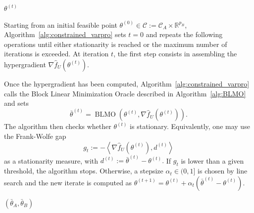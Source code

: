 \documentclass{article}
\DeclareMathOperator{\R}{\mathbb{R}}
\begin{document}
\label{sec:alg}
\begin{algorithm}[t]
\caption{Constrained Regularized Variable Projection (CR-VarPro)}
\label{alg:constrained_varpro}
\begin{algorithmic}
\ENDIF
\STATE{Set $\theta^{(t+1)} = \theta^{(t)} + \alpha_t (\bar\theta^{(t)} - \theta^{(t)})$, with $\alpha_t \in (0, 1]$ stepsize chosen via a line search}
\ENDWHILE
\RETURN $\theta^{(t)}$
\end{algorithmic}
\end{algorithm}

Starting from an initial feasible point \(\theta^{(0)}\in \mathcal C := \mathcal C_A\times\mathbb{R}^{p_B}\),
Algorithm~\ref{alg:constrained_varpro} sets \(t=0\) and repeats the following operations until either stationarity is
reached or the maximum number of iterations is exceeded. At iteration \(t\), the first step consists in assembling the hypergradient $\nabla \widehat f_U(\theta^{(t)})$. 

Once the hypergradient has been computed, Algorithm~\ref{alg:constrained_varpro} calls the Block Linear Minimization Oracle described in Algorithm~\ref{alg:BLMO} and sets
\[
    \bar\theta^{(t)}
    =
    \operatorname{BLMO}
    \left(
        \theta^{(t)},
        \nabla \widehat f_U(\theta^{(t)})
    \right).
\]
The algorithm then checks whether \(\theta^{(t)}\) is stationary. Equivalently, one may use the
Frank-Wolfe gap
\[
    g_t
    :=
    -
    \left\langle
        \nabla \widehat f_U(\theta^{(t)}),
        d^{(t)}
    \right\rangle
\]
as a stationarity measure, with  $d^{(t)}:=\bar\theta^{(t)}-\theta^{(t)}.$  If $g_t$ is lower than a given threshold, the algorithm stops. Otherwise, a stepsize
\(\alpha_t\in(0,1]\) is chosen by line search and the new iterate is computed as
$\theta^{(t+1)}
    =
    \theta^{(t)}
    +
    \alpha_t
    \left(
        \bar\theta^{(t)}-\theta^{(t)}
    \right).$

  

\begin{algorithm}[t]
\caption{Block Linear Minimization Oracle (BLMO)}
\label{alg:BLMO}
\begin{algorithmic}
\STATE{Input: $\tilde\theta=(\tilde\theta_A,\tilde\theta_B) \in \mathcal C_A \times \mathcal \R^{p_B}$, $\nabla \widehat f_U(\tilde\theta)$}
\RETURN $(\bar \theta_A,\bar \theta_B)$
\end{algorithmic}
\end{algorithm}
\end{document}
